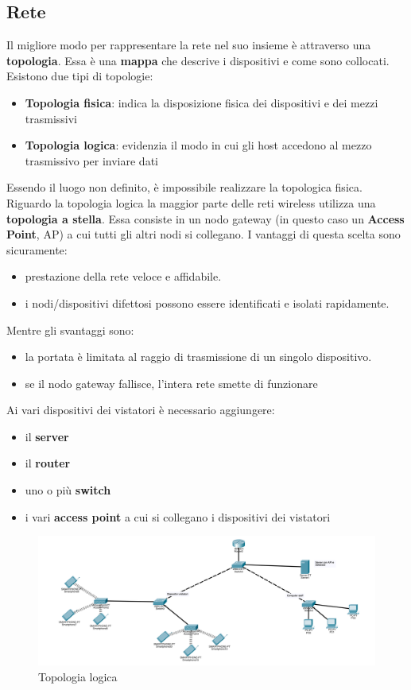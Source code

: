 \subsection{Rete}
Il migliore modo per rappresentare la rete nel suo insieme è attraverso una \textbf{topologia}. Essa è una \textbf{mappa} che descrive i dispositivi e come sono collocati. Esistono due tipi di topologie:
\begin{itemize}
    \item \textbf{Topologia fisica}: indica la disposizione fisica dei dispositivi e dei mezzi trasmissivi
    \item \textbf{Topologia logica}: evidenzia il modo in cui gli host accedono al mezzo trasmissivo per inviare dati
\end{itemize}Essendo il luogo non definito, è impossibile realizzare la topologica fisica. Riguardo la topologia logica la maggior parte delle reti wireless utilizza una \textbf{topologia a stella}. Essa consiste in un nodo gateway (in questo caso un \textbf{Access Point}, AP) a cui tutti gli altri nodi si collegano. I vantaggi di questa scelta sono sicuramente:
\begin{itemize}
    \item prestazione della rete veloce e affidabile.
    \item i nodi/dispositivi difettosi possono essere identificati e isolati rapidamente.
\end{itemize}
Mentre gli svantaggi sono: 
\begin{itemize}
    \item la portata è limitata al raggio di trasmissione di un singolo dispositivo.
    \item se il nodo gateway fallisce, l'intera rete smette di funzionare
\end{itemize}
\clearpage
Ai vari dispositivi dei vistatori è necessario aggiungere:
\begin{itemize}
    \item il \textbf{server}
    \item il \textbf{router}
    \item uno o più \textbf{switch}
    \item i vari \textbf{access point} a cui si collegano i dispositivi dei vistatori
\end{itemize}

\begin{center}
    \begin{figure}[htp]
        \centering
        \includegraphics[width=\textwidth]{diagrams/network_diagram_v3.png}
        \caption{Topologia logica}
        \label{fig:topologia_logica}
    \end{figure}
\end{center}

